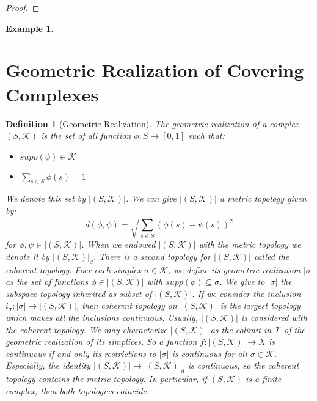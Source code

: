 \documentclass{amsart}
\newtheorem{definition}{Definition}[section]
\newtheorem{example}{Example}[section]
\begin{document}
\begin{proof}

\end{proof}



\begin{example}

\end{example}















\section{Geometric Realization of Covering Complexes}

\begin{definition}[Geometric Realization]
The geometric realization of a complex $(S,\mathcal{K})$ is the set of all function $\phi\colon S\longrightarrow [0,1]$ such that:
\begin{itemize}
\item $supp(\phi)\in\mathcal{K}$
\item $\sum_{s\in S}\phi(s)=1$
\end{itemize}
We denote this set by $\vert (S,\mathcal{K})\vert$. We can give $\vert (S,\mathcal{K})\vert$ a metric topology given by:
\[
d(\phi,\psi)=\sqrt{\sum_{s\in S}(\phi(s)-\psi(s))^{2}}
\]
for $\phi,\psi\in \vert (S,\mathcal{K})\vert$. When we endowed $\vert (S,\mathcal{K})\vert$ with the metric topology we denote it by $\vert (S,\mathcal{K})\vert_d$. There is a second topology for $\vert (S,\mathcal{K})\vert$ called the coherent topology. Foer each simplex $\sigma\in\mathcal{K}$, we define its geometric realization $\vert\sigma\vert$ as the set of functions $\phi\in \vert (S,\mathcal{K})\vert$ with $supp(\phi)\subseteq \sigma$. We give to $\vert \sigma\vert$ the subspace topology inherited as subset of $\vert (S,\mathcal{K})\vert$. If we consider the inclusion $i_\sigma\colon\vert\sigma\vert\longrightarrow \vert (S,\mathcal{K})\vert$, then coherent topology on $\vert (S,\mathcal{K})\vert$ is the largest topology which makes all the inclusions continuous. Usually, $\vert (S,\mathcal{K})\vert$ is considered with the coherent topology. We may characterize $\vert (S,\mathcal{K})\vert$ as the colimit  in $\mathcal{T}$ of the geometric realization of its simplices. So a function $f\colon\vert (S,\mathcal{K})\vert\longrightarrow X$ is continuous if and only its restrictions to $\vert\sigma\vert$ is continuous for all $\sigma\in\mathcal{K}$. Especially, the identity $\vert (S,\mathcal{K})\vert\longrightarrow \vert (S,\mathcal{K})\vert_d$ is continuous, so the coherent topology contains the metric topology. In particular, if $(S,\mathcal{K})$ is a finite complex, then both topologies coincide.
\end{definition}
\end{document}
